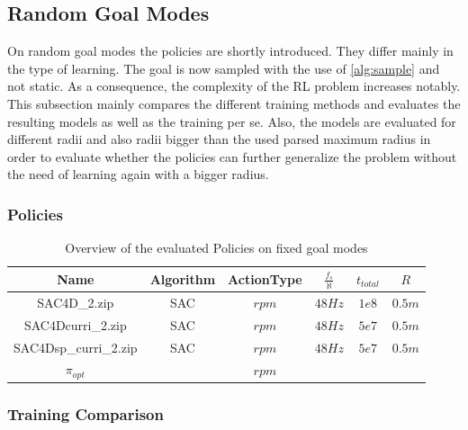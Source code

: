 


\newpage

\subsection{Random Goal Modes}
On random goal modes the policies are shortly introduced. 
They differ mainly in the type of learning. 
The goal is now sampled with the use of \cref{alg:sample} and not static. 
As a consequence, the complexity of the RL problem increases notably. 
This subsection mainly compares the different training methods and evaluates the resulting models as well as the training per se. 
Also, the models are evaluated for different radii and also radii bigger than the used parsed maximum radius in order to evaluate whether the policies 
can further generalize the problem without the need of learning again with a bigger radius.

\subsubsection{Policies}

\newpage

\begin{longtable}{|c|c|c|c|c|c|}
	\caption{Overview of the evaluated Policies on random goal modes}\label{tab:pi2}\\
	
	\hline
	Name & Algorithm & ActionType & $\frac{f_s}{\aleph}$ & $t_{total}$ & $R$\\
	\hline
	\endfirsthead
	\caption[]{Overview of the evaluated Policies on fixed goal modes}
	\endhead
	SAC4D\_2.zip & SAC & $rpm$ & $48Hz$ & $1e8$ & $0.5m$\\
	\hline
	SAC4Dcurri\_2.zip & SAC & $rpm$ & $48Hz$ & $5e7$ & $0.5m$\\
	\hline
	SAC4Dsp\_curri\_2.zip & SAC & $rpm$ & $48Hz$ & $5e7$ & $0.5m$\\
	\hline
	$\pi_{opt}$ & & $rpm$ & & & \\
	\hline
\end{longtable}

\newpage

\subsubsection{Training Comparison}

